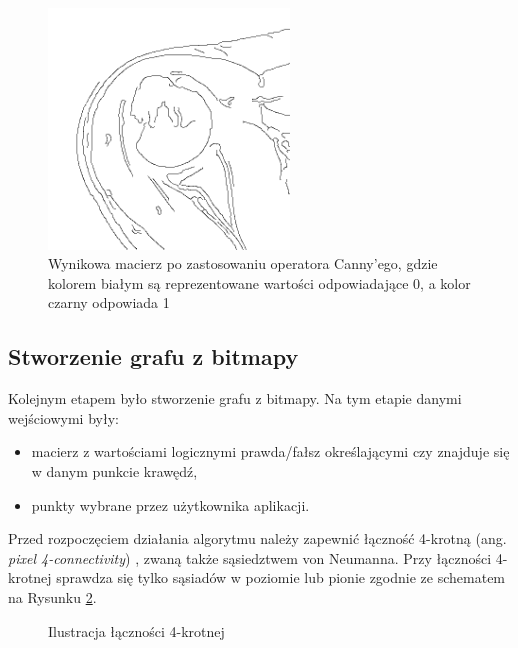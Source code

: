 \documentclass[a4paper,11pt,twoside,openright]{report}
\theoremstyle{definition}
\begin{document}
\begin{figure}[h!]
	\center
	\includegraphics[width=0.57\textwidth]{127}
	\caption{Wynikowa macierz po zastosowaniu operatora Canny'ego, gdzie kolorem białym są 
	reprezentowane wartości odpowiadające 0, a kolor czarny odpowiada 1}
    	\label{fig:127}
\end{figure}

\subsection {Stworzenie grafu z bitmapy}

Kolejnym etapem było stworzenie grafu z bitmapy. Na tym etapie danymi wejściowymi były:
\begin{itemize}[noitemsep]
\item macierz z wartościami logicznymi prawda/fałsz określającymi czy znajduje się w danym
punkcie krawędź,
\item punkty wybrane przez użytkownika aplikacji.
\end{itemize}

Przed rozpoczęciem działania algorytmu należy zapewnić łączność 4-krotną
(ang. \textit{pixel 4-connectivity}) \cite{Pixel connectivity}, zwaną także
sąsiedztwem von Neumanna. Przy łączności 4-krotnej sprawdza się tylko sąsiadów
w poziomie lub pionie zgodnie ze schematem na Rysunku \ref{fig:4pixel}.

\begin{figure}[h!]
\begin{center}
\end{center}
\caption{Ilustracja łączności 4-krotnej}
\label{fig:4pixel}
\end{figure}
\end{document}
